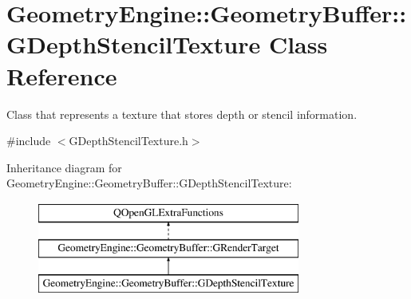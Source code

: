 \hypertarget{class_geometry_engine_1_1_geometry_buffer_1_1_g_depth_stencil_texture}{}\section{Geometry\+Engine\+::Geometry\+Buffer\+::G\+Depth\+Stencil\+Texture Class Reference}
\label{class_geometry_engine_1_1_geometry_buffer_1_1_g_depth_stencil_texture}


Class that represents a texture that stores depth or stencil information.  




{\ttfamily \#include $<$G\+Depth\+Stencil\+Texture.\+h$>$}

Inheritance diagram for Geometry\+Engine\+::Geometry\+Buffer\+::G\+Depth\+Stencil\+Texture\+:\begin{figure}[H]
\begin{center}
\leavevmode
\includegraphics[height=3.000000cm]{class_geometry_engine_1_1_geometry_buffer_1_1_g_depth_stencil_texture}
\end{center}
\end{figure}
